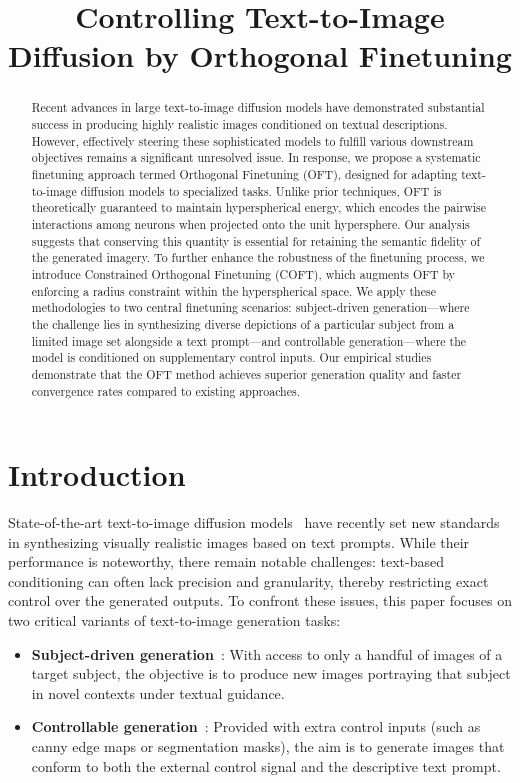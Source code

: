 \title{Controlling Text-to-Image Diffusion by Orthogonal Finetuning}

\begin{abstract}
Recent advances in large text-to-image diffusion models have demonstrated substantial success in producing highly realistic images conditioned on textual descriptions. However, effectively steering these sophisticated models to fulfill various downstream objectives remains a significant unresolved issue. In response, we propose a systematic finetuning approach termed Orthogonal Finetuning (OFT), designed for adapting text-to-image diffusion models to specialized tasks. Unlike prior techniques, OFT is theoretically guaranteed to maintain hyperspherical energy, which encodes the pairwise interactions among neurons when projected onto the unit hypersphere. Our analysis suggests that conserving this quantity is essential for retaining the semantic fidelity of the generated imagery. To further enhance the robustness of the finetuning process, we introduce Constrained Orthogonal Finetuning (COFT), which augments OFT by enforcing a radius constraint within the hyperspherical space. We apply these methodologies to two central finetuning scenarios: subject-driven generation—where the challenge lies in synthesizing diverse depictions of a particular subject from a limited image set alongside a text prompt—and controllable generation—where the model is conditioned on supplementary control inputs. Our empirical studies demonstrate that the OFT method achieves superior generation quality and faster convergence rates compared to existing approaches.
\end{abstract}

\section{Introduction}

State-of-the-art text-to-image diffusion models~\cite{saharia2022photorealistic,ramesh2022hierarchical,rombach2022high} have recently set new standards in synthesizing visually realistic images based on text prompts. While their performance is noteworthy, there remain notable challenges: text-based conditioning can often lack precision and granularity, thereby restricting exact control over the generated outputs. To confront these issues, this paper focuses on two critical variants of text-to-image generation tasks:

\begin{itemize}[leftmargin=*,nosep]

    \item \textbf{Subject-driven generation}~\cite{ruiz2023dreambooth}: With access to only a handful of images of a target subject, the objective is to produce new images portraying that subject in novel contexts under textual guidance.
    \item \textbf{Controllable generation}~\cite{zhang2023adding,mou2023t2i}: Provided with extra control inputs (such as canny edge maps or segmentation masks), the aim is to generate images that conform to both the external control signal and the descriptive text prompt.
\end{itemize}

